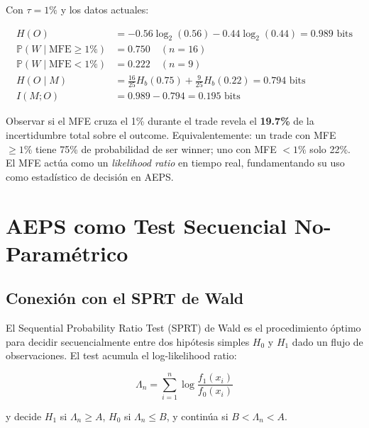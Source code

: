 \documentclass[11pt,a4paper]{article}
\newcommand{\Prob}{\mathbb{P}}
\begin{document}
Con $\tau = 1\%$ y los datos actuales:

\begin{align}
H(O) &= -0.56 \log_2(0.56) - 0.44 \log_2(0.44) = 0.989 \text{ bits} \\
\Prob(W \mid \text{MFE} \geq 1\%) &= 0.750 \quad (n = 16) \\
\Prob(W \mid \text{MFE} < 1\%) &= 0.222 \quad (n = 9) \\
H(O \mid M) &= \frac{16}{25} H_b(0.75) + \frac{9}{25} H_b(0.22) = 0.794 \text{ bits} \\
I(M; O) &= 0.989 - 0.794 = \bm{0.195} \text{ bits}
\label{eq:mi_calc}
\end{align}

\begin{tcolorbox}[defbox, title=Interpretaci\'on]
Observar si el MFE cruza el 1\% durante el trade revela el
\textbf{19.7\%} de la incertidumbre total sobre el outcome.
Equivalentemente: un trade con MFE $\geq 1\%$ tiene 75\% de
probabilidad de ser winner; uno con MFE $< 1\%$ solo 22\%.
El MFE act\'ua como un \textit{likelihood ratio} en tiempo real,
fundamentando su uso como estad\'istico de decisi\'on en AEPS.
\end{tcolorbox}


\section{AEPS como Test Secuencial No-Param\'etrico}
\label{sec:sprt}

\subsection{Conexi\'on con el SPRT de Wald}

El Sequential Probability Ratio Test (SPRT) de Wald \cite{wald1945sequential}
es el procedimiento \'optimo para decidir secuencialmente entre dos
hip\'otesis simples $H_0$ y $H_1$ dado un flujo de observaciones.
El test acumula el log-likelihood ratio:

\begin{equation}
\Lambda_n = \sum_{i=1}^{n} \log \frac{f_1(x_i)}{f_0(x_i)}
\label{eq:sprt_classic}
\end{equation}

y decide $H_1$ si $\Lambda_n \geq A$, $H_0$ si $\Lambda_n \leq B$,
y contin\'ua si $B < \Lambda_n < A$.
\end{document}
